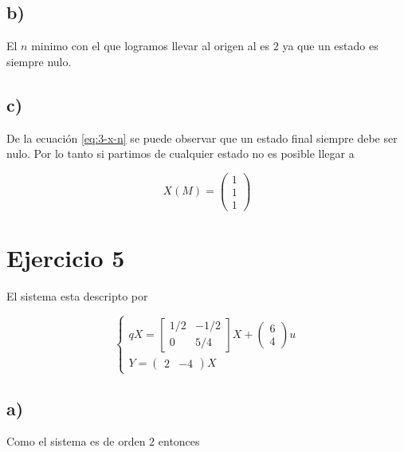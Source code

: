 \documentclass[11pt,a4paper]{article}
\newcommand{\siseq}[1]{ \left\{ \begin{array}{c}
    #1
\end{array} \right. }
\begin{document}
    \subsection*{b)}

    El $n$ minimo con el que logramos llevar al origen al es $2$ ya que un estado es siempre nulo.

    \subsection*{c)}

    De la ecuación \ref{eq:3-x-n} se puede observar que un estado final siempre debe ser nulo. Por 
    lo tanto si partimos de cualquier estado no es posible llegar a 

    \begin{equation}
        X(M) = 
        \begin{pmatrix}
            1 \\ 1 \\ 1
        \end{pmatrix}
    \end{equation}

    \section*{Ejercicio 5}

    El sistema esta descripto por 

    \begin{equation}
        \siseq{
            qX = 
            \begin{bmatrix}
                1/2 & -1/2 \\
                0 & 5/4
            \end{bmatrix} X
            +
            \begin{pmatrix}
                6 \\ 4
            \end{pmatrix} u \\ 
            Y = 
            \begin{pmatrix}
                2 & -4
            \end{pmatrix} X
        }
    \end{equation}
    
    \subsection*{a)}

    Como el sistema es de orden $2$ entonces 
\end{document}
